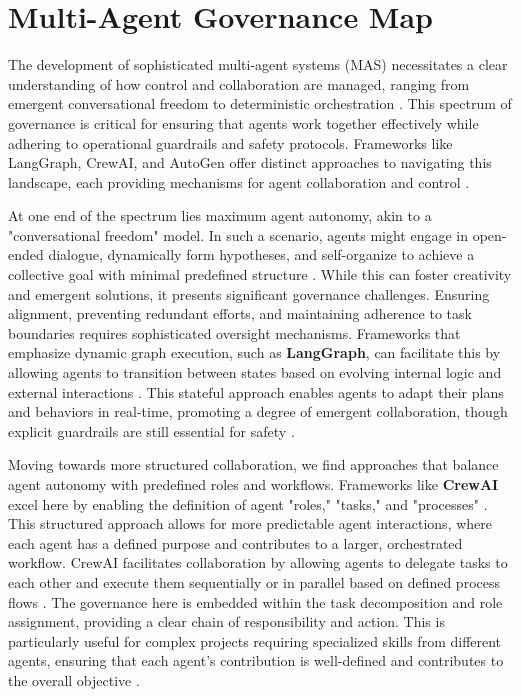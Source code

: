 \section{Multi-Agent Governance Map}

The development of sophisticated multi-agent systems (MAS) necessitates a clear understanding of how control and collaboration are managed, ranging from emergent conversational freedom to deterministic orchestration \cite{Reger2026}. This spectrum of governance is critical for ensuring that agents work together effectively while adhering to operational guardrails and safety protocols. Frameworks like LangGraph, CrewAI, and AutoGen offer distinct approaches to navigating this landscape, each providing mechanisms for agent collaboration and control \cite{Reger2026, Gartner2025}.

At one end of the spectrum lies maximum agent autonomy, akin to a "conversational freedom" model. In such a scenario, agents might engage in open-ended dialogue, dynamically form hypotheses, and self-organize to achieve a collective goal with minimal predefined structure \cite{Reger2026}. While this can foster creativity and emergent solutions, it presents significant governance challenges. Ensuring alignment, preventing redundant efforts, and maintaining adherence to task boundaries requires sophisticated oversight mechanisms. Frameworks that emphasize dynamic graph execution, such as \textbf{LangGraph}, can facilitate this by allowing agents to transition between states based on evolving internal logic and external interactions \cite{LangGraphDocs}. This stateful approach enables agents to adapt their plans and behaviors in real-time, promoting a degree of emergent collaboration, though explicit guardrails are still essential for safety \cite{Reger2026}.

Moving towards more structured collaboration, we find approaches that balance agent autonomy with predefined roles and workflows. Frameworks like \textbf{CrewAI} excel here by enabling the definition of agent "roles," "tasks," and "processes" \cite{CrewAIDocs}. This structured approach allows for more predictable agent interactions, where each agent has a defined purpose and contributes to a larger, orchestrated workflow. CrewAI facilitates collaboration by allowing agents to delegate tasks to each other and execute them sequentially or in parallel based on defined process flows \cite{Reger2026}. The governance here is embedded within the task decomposition and role assignment, providing a clear chain of responsibility and action. This is particularly useful for complex projects requiring specialized skills from different agents, ensuring that each agent's contribution is well-defined and contributes to the overall objective \cite{Gartner2025}.

